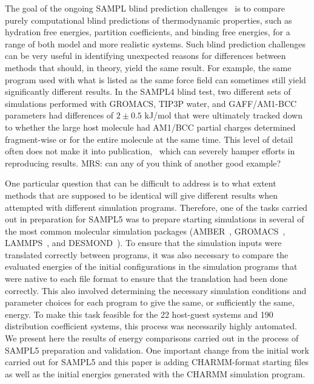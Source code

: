 The goal of the ongoing SAMPL blind prediction
challenges~\citep{Muddana2014SAMPL4,Muddana2012a,geballe_sampl2_2010,guthrie_blind_2009}
is to compare purely computational blind predictions of thermodynamic
properties, such as hydration free energies, partition coefficients,
and binding free energies, for a range of both model and more
realistic systems. Such blind prediction challenges can be very useful
in identifying unexpected reasons for differences between methods that
should, in theory, yield the same result. For example, the same
program used with what is listed as the same force field can sometimes
still yield significantly different results. In the SAMPL4 blind test,
two different sets of simulations performed with GROMACS, TIP3P water,
and GAFF/AM1-BCC parameters had differences of $2 \pm 0.5$ kJ/mol that
were ultimately tracked down to whether the large host molecule had
AM1/BCC partial charges determined fragment-wise or for the entire
molecule at the same time. This level of detail often does not make it
into publication,~\cite{Monroe2014} which can severely hamper efforts
in reproducing results.
{\color{red}MRS: can any of you think of another good example?}

One particular question that can be difficult to address is to what
extent methods that are supposed to be identical will give different
results when attempted with different simulation programs.  Therefore,
one of the tasks carried out in preparation for SAMPL5 was to prepare
starting simulations in several of the most common molecular
simulation packages (AMBER~\citep{Amber14},
GROMACS~\citep{hess_gromacs_2008}, LAMMPS~\citep{plimpton_fast_1995},
and DESMOND~\citep{bowers_scalable_2006}). To ensure that the
simulation inputs were translated correctly between programs, it was
also necessary to compare the evaluated energies of the initial
configurations in the simulation programs that were native to each
file format to ensure that the translation had been done correctly.
This also involved determining the necessary simulation conditions and
parameter choices for each program to give the same, or sufficiently
the same, energy.  To make this task feasible for the 22 host-guest
systems and 190 distribution coefficient systems, this process was
necessarily highly automated. We present here the results of energy
comparisons carried out in the process of SAMPL5 preparation and
validation.  One important change from the initial work carried out
for SAMPL5 and this paper is adding CHARMM-format starting files as
well as the initial energies generated with the CHARMM simulation
program.

